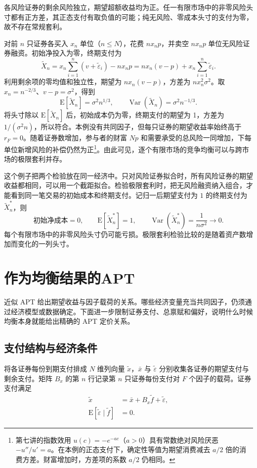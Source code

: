 \begin{tcolorbox}[example]
\begin{solution}[blank-type=manual,blank-vsep=5\baselineskip]
各风险证券的剩余风险独立，期望超额收益均为正。任一有限市场中的非零风险头寸都有正方差，其正态支付有取负值的可能；纯无风险、零成本头寸的支付为零，故不存在常规套利。

对前 $n$ 只证券各买入 $x_n$ 单位（$n\le N$），花费 $nx_np$，并卖空 $nx_np$ 单位无风险证券融资。初始净投入为零，终期支付为
\[
 \widetilde X_n=x_n\sum_{i=1}^n(v+\widetilde\varepsilon_i)-nx_np
 =nx_n(v-p)+x_n\sum_{i=1}^n\widetilde\varepsilon_i.
\]
利用剩余项的零均值和独立性，期望为 $nx_n(v-p)$，方差为 $nx_n^2\sigma^2$。取 $x_n=n^{-2/3}$、$v-p=\sigma^2$，得到
\[
 \mathrm E[\widetilde X_n]=\sigma^2n^{1/3},\qquad
 \operatorname{Var}(\widetilde X_n)=\sigma^2n^{-1/3}.
\]
将头寸除以 $\mathrm E[\widetilde X_n]$ 后，初始成本仍为零，终期支付的期望为 1，方差为 $1/(\sigma^2 n)$，所以符合。本例没有共同因子，但每只证券的期望收益率始终高于 $r_F=0$。随着证券数增加，参与者的财富 $Np$ 和需要承受的总风险一同增加，下每单位新增风险的补偿仍然为正\footnote{第七讲的指数效用 $u(c)=-e^{-ac}$（$a>0$）具有常数绝对风险厌恶 $-u''/u'=a$。在本例的正态支付下，确定性等值为期望消费减去 $a/2$ 倍的消费方差。财富增加时，方差项的系数 $a/2$ 仍相同。}。由此可见，逐个有限市场的竞争均衡可以与跨市场的极限套利并存。
\end{solution}
\end{tcolorbox}

这个例子把两个检验放在同一经济中。只对风险证券拟合时，所有风险证券的期望收益都相同，可以用一个截距拟合。检验极限套利时，把无风险融资纳入组合，才能看到同一笔交易的初始成本和终期支付。记归一后期望支付为 $1$ 的终期支付为 $\widetilde X_n^*$，则
\[
 \text{初始净成本}=0,\qquad
 \mathrm E[\widetilde X_n^*]=1,\qquad
 \operatorname{Var}(\widetilde X_n^*)=\frac{1}{n\sigma^2}\longrightarrow0.
\]
每个有限市场中的非零风险头寸仍可能亏损。极限套利检验比较的是随着资产数增加而变化的一列头寸。

\section{作为均衡结果的APT}\label{sec:wj-fourteen-5}
近似 APT 给出期望收益与因子载荷的关系。哪些经济变量充当共同因子，仍须通过经济模型或数据确定。下面进一步限制证券支付、总禀赋和偏好，说明什么时候均衡本身就能给出精确的 APT 定价关系。

\subsection{支付结构与经济条件}
将各证券每份到期支付排成 $N$ 维列向量 $\widetilde x$，$\bar x$ 与 $\widetilde\varepsilon$ 分别收集各证券的期望支付与剩余支付。矩阵 $B_x$ 的第 $n$ 行记录第 $n$ 只证券每份支付对 $F$ 个因子的载荷。证券支付满足
\begin{subequations}\label{eq:wj-14-7}
\begin{align}
 \widetilde x&=\bar x+B_x\widetilde f+\widetilde\varepsilon,\label{eq:wj-14-7a}\\
 \mathrm E[\widetilde\varepsilon\mid\widetilde f]&=0.\label{eq:wj-14-7b}
\end{align}
\end{subequations}

